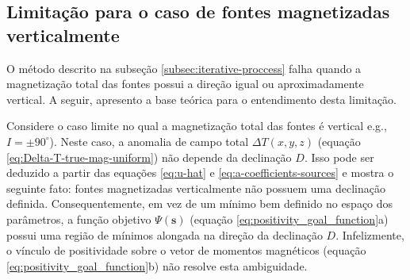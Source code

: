 \subsection{Limitação para o caso de fontes magnetizadas verticalmente}
\label{subsec:vertical-magnetization}

O método descrito na subseção \ref{subsec:iterative-proccess} falha quando a magnetização total das 
fontes possui a direção igual ou aproximadamente vertical. A seguir, apresento a base teórica para o 
entendimento desta limitação. 

Considere o caso limite no qual a magnetização total das fontes é vertical e.g., $I = \pm 90^\circ$). 
Neste caso, a anomalia de campo total $\Delta T(x, y, z)$ (equação \ref{eq:Delta-T-true-mag-uniform}) 
não depende da declinação $D$. Isso pode ser deduzido a partir das equações \ref{eq:u-hat} e 
\ref{eq:a-coefficients-sources} e mostra o seguinte fato: fontes magnetizadas verticalmente não possuem 
uma declinação definida. Consequentemente, em vez de um mínimo bem definido no espaço dos parâmetros, a 
função objetivo $\Psi(\mathbf{s})$ (equação \ref{eq:positivity_goal_function}a) possui uma região de mínimos 
alongada na direção da declinação $D$. Infelizmente, o vínculo de positividade sobre o vetor de momentos magnéticos 
(equação  \ref{eq:positivity_goal_function}b) não resolve esta ambiguidade.

